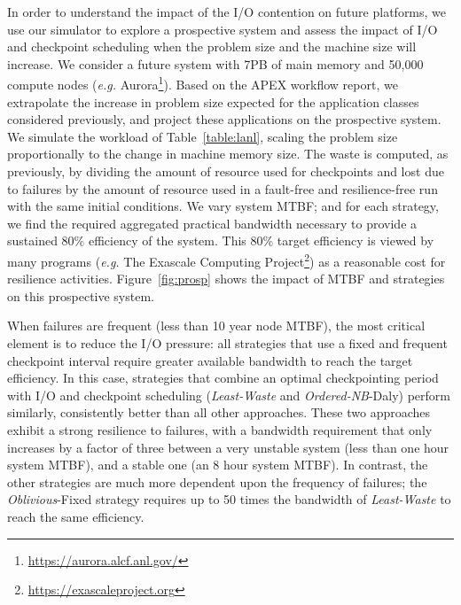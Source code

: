 \documentclass[two]{article}
\newcommand{\eg}[0]{\emph{e.g.}\xspace}
\newcommand{\nocoop}{\emph{Oblivious}\xspace}
\newcommand{\fifononblock}{\emph{Ordered-NB}\xspace}
\newcommand{\leastwaste}{\emph{Least-Waste}\xspace}
\def\propfixed{\nocoop-Fixed\xspace}
\def\fifodaly{\fifononblock-Daly\xspace}
\def\cooperative{\leastwaste}
\begin{document}
In order to understand the impact of the I/O contention on future platforms, we
use our simulator to explore a prospective system and assess the impact of I/O
and checkpoint scheduling when the problem size and the machine size will
increase. We consider a future system with 7PB of main memory and 50,000
compute nodes (\eg Aurora\footnote{\url{https://aurora.alcf.anl.gov/}}). Based
on the APEX workflow report, we extrapolate the increase in problem size
expected for the application classes considered previously, and project these
applications on the prospective system.  We simulate the workload of
Table~\ref{table:lanl}, scaling the problem size proportionally to the change
in machine memory size. The waste is computed, as previously, by dividing the
amount of resource used for checkpoints and lost due to failures by the amount
of resource used in a fault-free and resilience-free run with the same initial
conditions.
%
We vary system MTBF; and for each strategy, we find the required aggregated
practical bandwidth necessary to provide a sustained 80\% efficiency of the
system.  This 80\% target efficiency is viewed by many programs (\eg 
The Exascale Computing Project\footnote{\url{https://exascaleproject.org}}) as a
reasonable cost for resilience activities.
%
Figure~\ref{fig:prosp} shows the impact of MTBF and strategies on this
prospective system.

When failures are frequent (less than 10 year node MTBF), the most critical
element is to reduce the I/O pressure: all strategies that use a fixed and
frequent checkpoint interval require greater available bandwidth to reach the
target efficiency.  In this case, strategies that combine an optimal
checkpointing period with I/O and checkpoint scheduling (\cooperative and
\fifodaly) perform similarly, consistently better than all other approaches.
These two approaches exhibit a strong resilience to failures, with a bandwidth
requirement that only increases by a factor of three between a very unstable system
(less than one hour system MTBF), and a stable one (an 8 hour system MTBF). In
contrast, the other strategies are much more dependent upon the frequency of
failures; the \propfixed strategy requires up to 50 times the bandwidth of
\cooperative to reach the same efficiency.
\end{document}
